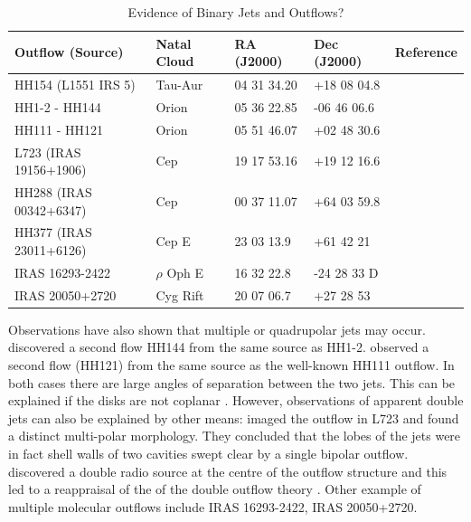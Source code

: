 \documentclass{aa}
\begin{document}
\begin{table}
\begin{center}
\caption{Evidence of Binary Jets and Outflows?}
\label{BinaryOutflowTable}
\begin{tabular}{l l l l l}
\hline
\hline
Outflow (Source) & Natal Cloud & RA (J2000) & Dec (J2000) & Reference \\
\hline
HH154 (L1551 IRS 5) & Tau-Aur & 04 31 34.20 & +18 08 04.8 & \citet{2005ApJ...L}\\
HH1-2 - HH144 & Orion & 05 36 22.85 & -06 46 06.6 & \citet{1993ApJ...408L..49R} \\
HH111 - HH121 & Orion & 05 51 46.07 & +02 48 30.6 & \citet{1994AA...289L..19G} \\
L723 (IRAS 19156+1906) & Cep & 19 17 53.16 & +19 12 16.6 & \citet{2004RMxAC..21..100A} \\
HH288 (IRAS 00342+6347) & Cep& 00 37 11.07 & +64 03 59.8 & \citet{2001AA...375.1018G} \\
HH377 (IRAS 23011+6126) & Cep E & 23 03 13.9 & +61 42 21 & \citet{1997ApJ...474..749L} \\
IRAS 16293-2422 & $\rho$ Oph E & 16 32 22.8 & -24 28 33 D & \citet{2001ApJ...547..899H} \\
IRAS 20050+2720 & Cyg Rift & 20 07 06.7 & +27 28 53 & \citet{1995ApJ...445L..51B} \\
\hline
\end{tabular}
\end{center}
\end{table}





Observations have also shown that multiple or quadrupolar jets may occur.
\citet{1993ApJ...408L..49R} discovered a second flow HH144 from the same source as HH1-2. 
\citet{1994A&A...289L..19G} observed a second flow (HH121) from the same source as the well-known HH111 outflow.
In both cases there are large angles of separation between the two jets.
This can be explained if the disks 
are not coplanar \citep{1994ARA&A..32..465M}.
However, observations of apparent double jets can also be explained by other means: \citet{1990ApJ...357..524A} imaged the outflow in L723 and found a distinct multi-polar morphology. They concluded that the lobes of the jets were in fact shell walls of two cavities swept clear by a single bipolar outflow. \citet{1991ApJ...376..615A} discovered a double radio source at the centre of the outflow structure and this led to a reappraisal of the of the double outflow theory \citep{1996ApJ...473L.123A,1997ApJ...489..734G,1998ASPC..132..303A,1998ApJ...504..334H,1999A&A...346..233P,2002ApJ...575..337S,2003RMxAC..15..135E,2004RMxAC..21..100A}.
Other example of multiple molecular outflows include IRAS 16293-2422, IRAS 20050+2720.
\end{document}
